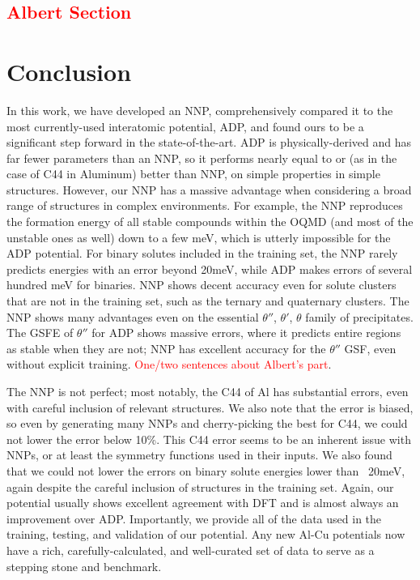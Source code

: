 \documentclass{article}
\begin{document}
\textcolor{red}{\subsection{Albert Section}}

\section{Conclusion}
In this work, we have developed an NNP, comprehensively compared it to the most currently-used interatomic potential, ADP, and found ours to be a significant step forward in the state-of-the-art.
ADP is physically-derived and has far fewer parameters than an NNP, so it performs nearly equal to or (as in the case of C44 in Aluminum) better than NNP, on simple properties in simple structures.
However, our NNP has a massive advantage when considering a broad range of structures in complex environments.
For example, the NNP reproduces the formation energy of all stable compounds within the OQMD (and most of the unstable ones as well) down to a few meV, which is utterly impossible for the ADP potential.
For binary solutes included in the training set, the NNP rarely predicts energies with an error beyond 20meV, while ADP makes errors of several hundred meV for binaries.
NNP shows decent accuracy even for solute clusters that are not in the training set, such as the ternary and quaternary clusters.
The NNP shows many advantages even on the essential $\theta''$, $\theta'$, $\theta$ family of precipitates.
The GSFE of $\theta''$ for ADP shows massive errors, where it predicts entire regions as stable when they are not; NNP has excellent accuracy for the $\theta''$ GSF, even without explicit training.
\textcolor{red}{One/two sentences about Albert's part}.

The NNP is not perfect; most notably, the C44 of Al has substantial errors, even with careful inclusion of relevant structures.
We also note that the error is biased, so even by generating many NNPs and cherry-picking the best for C44, we could not lower the error below 10\%.
This C44 error seems to be an inherent issue with NNPs, or at least the symmetry functions used in their inputs.
We also found that we could not lower the errors on binary solute energies lower than ~20meV, again despite the careful inclusion of structures in the training set.
Again, our potential usually shows excellent agreement with DFT and is almost always an improvement over ADP.
Importantly, we provide all of the data used in the training, testing, and validation of our potential.
Any new Al-Cu potentials now have a rich, carefully-calculated, and well-curated set of data to serve as a stepping stone and benchmark. 
\end{document}
